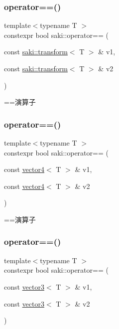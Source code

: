 \subsubsection{\texorpdfstring{operator==()}{operator==()}\hspace{0.1cm}{\footnotesize\ttfamily [2/14]}}
{\footnotesize\ttfamily template$<$typename T $>$ \\
constexpr bool saki\+::operator== (\begin{DoxyParamCaption}\item[{const \mbox{\hyperlink{classsaki_1_1transform}{saki\+::transform}}$<$ T $>$ \&}]{v1,  }\item[{const \mbox{\hyperlink{classsaki_1_1transform}{saki\+::transform}}$<$ T $>$ \&}]{v2 }\end{DoxyParamCaption})}



==演算子 

\mbox{\label{namespacesaki_abe77ceb7257097320a66f9f182d11111}} 
\subsubsection{\texorpdfstring{operator==()}{operator==()}\hspace{0.1cm}{\footnotesize\ttfamily [3/14]}}
{\footnotesize\ttfamily template$<$typename T $>$ \\
constexpr bool saki\+::operator== (\begin{DoxyParamCaption}\item[{const \mbox{\hyperlink{classsaki_1_1vector4}{vector4}}$<$ T $>$ \&}]{v1,  }\item[{const \mbox{\hyperlink{classsaki_1_1vector4}{vector4}}$<$ T $>$ \&}]{v2 }\end{DoxyParamCaption})}



==演算子 

\mbox{\label{namespacesaki_a3ce1faca02399d52a09851a1b6e8afe3}} 
\subsubsection{\texorpdfstring{operator==()}{operator==()}\hspace{0.1cm}{\footnotesize\ttfamily [4/14]}}
{\footnotesize\ttfamily template$<$typename T $>$ \\
constexpr bool saki\+::operator== (\begin{DoxyParamCaption}\item[{const \mbox{\hyperlink{classsaki_1_1vector3}{vector3}}$<$ T $>$ \&}]{v1,  }\item[{const \mbox{\hyperlink{classsaki_1_1vector3}{vector3}}$<$ T $>$ \&}]{v2 }\end{DoxyParamCaption})}



